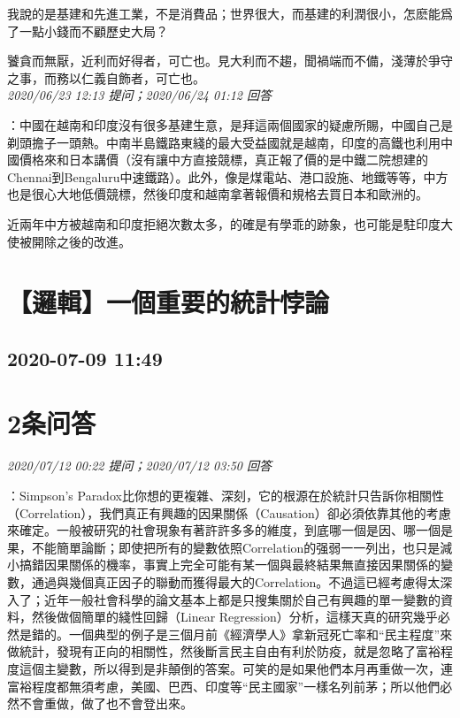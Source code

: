 \documentclass[twocolumn]{ctexart}
\begin{document}
我說的是基建和先進工業，不是消費品；世界很大，而基建的利潤很小，怎麽能爲了一點小錢而不顧歷史大局？

饕貪而無厭，近利而好得者，可亡也。見大利而不趨，聞禍端而不備，淺薄於爭守之事，而務以仁義自飾者，可亡也。
\\

\textit{\hfill\noindent\small 2020/06/23 12:13 提问；2020/06/24 01:12 回答}

：中國在越南和印度沒有很多基建生意，是拜這兩個國家的疑慮所賜，中國自己是剃頭擔子一頭熱。中南半島鐵路東綫的最大受益國就是越南，印度的高鐵也利用中國價格來和日本講價（沒有讓中方直接競標，真正報了價的是中鐵二院想建的Chennai到Bengaluru中速鐵路）。此外，像是煤電站、港口設施、地鐵等等，中方也是很心大地低價競標，然後印度和越南拿著報價和規格去買日本和歐洲的。

近兩年中方被越南和印度拒絕次數太多，的確是有學乖的跡象，也可能是駐印度大使被開除之後的改進。
\\


\section{【邏輯】一個重要的統計悖論}
\subsection{2020-07-09 11:49}


\section{2条问答}

\textit{\hfill\noindent\small 2020/07/12 00:22 提问；2020/07/12 03:50 回答}

：Simpson's Paradox比你想的更複雜、深刻，它的根源在於統計只告訴你相關性（Correlation），我們真正有興趣的因果關係（Causation）卻必須依靠其他的考慮來確定。一般被研究的社會現象有著許許多多的維度，到底哪一個是因、哪一個是果，不能簡單論斷；即使把所有的變數依照Correlation的强弱一一列出，也只是減小搞錯因果關係的機率，事實上完全可能有某一個與最終結果無直接因果關係的變數，通過與幾個真正因子的聯動而獲得最大的Correlation。不過這已經考慮得太深入了；近年一般社會科學的論文基本上都是只搜集關於自己有興趣的單一變數的資料，然後做個簡單的綫性回歸（Linear Regression）分析，這樣天真的研究幾乎必然是錯的。一個典型的例子是三個月前《經濟學人》拿新冠死亡率和“民主程度”來做統計，發現有正向的相關性，然後斷言民主自由有利於防疫，就是忽略了富裕程度這個主變數，所以得到是非顛倒的答案。可笑的是如果他們本月再重做一次，連富裕程度都無須考慮，美國、巴西、印度等“民主國家”一樣名列前茅；所以他們必然不會重做，做了也不會登出來。
\end{document}

